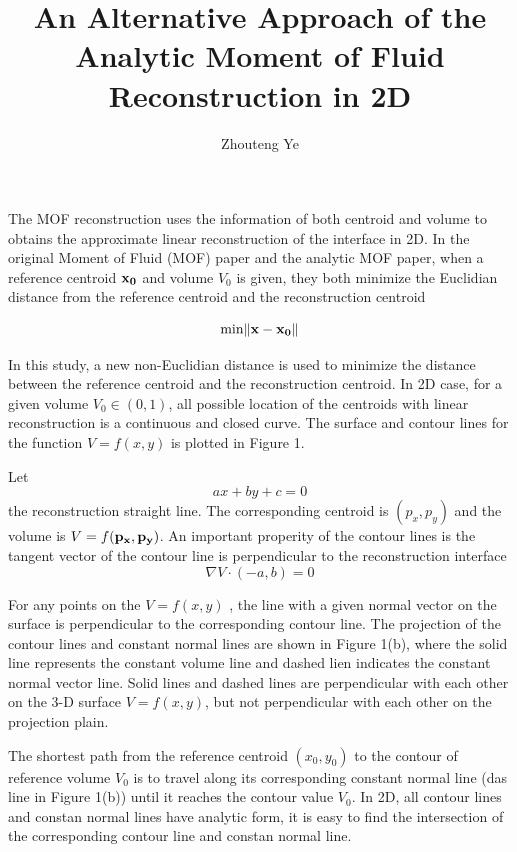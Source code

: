 \documentclass{article}
\begin{document}
\title{An Alternative Approach of the Analytic Moment of Fluid Reconstruction in 2D}
\author{Zhouteng Ye}

\maketitle

The MOF reconstruction uses the information of both centroid and volume to obtains the approximate linear reconstruction of the interface in 2D.
In the original Moment of Fluid (MOF) paper and the analytic MOF paper, 
when a reference centroid $\bf{x}_0$ and volume $V_0$ is given, 
they both minimize the Euclidian distance from the reference centroid and the reconstruction centroid

\begin{equation}
\rm{min}\|\bf{x-x_0}\|
\end{equation}

In this study, a new non-Euclidian distance is used to minimize the distance between the reference centroid and the reconstruction centroid. 
In 2D case, for a given volume $V_0 \in (0,1)$, all possible location of the centroids with linear reconstruction is a continuous and closed curve.
The surface and contour lines for the function $V = f(x,y)$ is plotted in Figure 1.

Let 
\begin{equation}
ax+by+c=0
\end{equation}
the reconstruction straight line. 
The corresponding centroid is $(p_x,p_y)$ and the volume is $V=f(\bf{p_x,p_y})$.
An important properity of the contour lines is the tangent vector of the contour line is perpendicular to the reconstruction interface
\begin{equation}
\nabla V \cdot (-a,b) = 0
\end{equation}

For any points on the $V = f(x,y)$ , the line with a given normal vector on the surface is perpendicular to the corresponding contour line. 
The projection of the contour lines and constant normal lines are shown in Figure 1(b), 
where the solid line represents the constant volume line and dashed lien indicates the constant normal vector line.
Solid lines and dashed lines are perpendicular with each other on the 3-D surface $V = f(x,y)$, 
but not perpendicular with each other on the projection plain.

The shortest path from the reference centroid $(x_0,y_0)$ to the contour of reference volume $V_0$ is to travel along its corresponding constant normal line (das line in Figure 1(b)) until it reaches the contour value $V_0$. 
In 2D, all contour lines and constan normal lines have analytic form, 
it is easy to find the intersection of the corresponding contour line and constan normal line.
\end{document}
